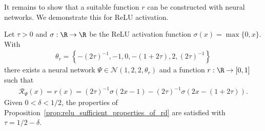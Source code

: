 \documentclass{amsart}[11pt]
\numberwithin{equation}{section}
\newcommand{\nn}{\mathcal{N}}
\newcommand{\realization}{\mathcal{R}}
\numberwithin{theorem}{section}
\begin{document}
It remains to show that a suitable function $r$ can be constructed with neural networks. We demonstrate this for ReLU activation.
\begin{lemma}\label{lem:r_with_relu}
    Let $\tau > 0$ and $\sigma: \R \to \R$ be the ReLU activation function $\sigma(x) = \max\{0, x\}$. With 
    \begin{align*}
        \theta_r = \left\{- (2\tau)^{-1}, -1, 0, -(1 + 2\tau), 2, (2\tau)^{-1}\right\}
    \end{align*}
    there exists a neural network $\Psi \in \nn(1, 2, 2, \theta_r)$ and a  function $r: \R \to [0, 1]$ such that
    \begin{align*}
        \realization_\Psi(x) = r(x) = (2\tau)^{-1} \sigma\left(2x - 1\right) - (2\tau)^{-1} \sigma\left(2x - \left(1 + 2\tau\right) \right).
    \end{align*}
    Given $0 < \delta < 1/2$, the properties of Proposition~\ref{prop:relu_sufficient_properties_of_rd} are satisfied with $\tau = 1/2 - \delta$.
\end{lemma}
\end{document}
